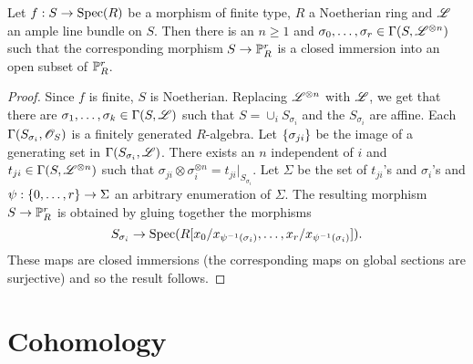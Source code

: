 \documentclass{memoir}
\begin{document}
\begin{thm}
    Let $f:S\to \Spec(R)$ be a morphism of finite type, $R$ a Noetherian ring and $\shf L$ an ample line bundle on $S$.
    Then there is an $n\ge 1$ and $\sigma_0,\dots,\sigma_r\in \Gamma(S,\shf L^{\otimes n})$ such that the corresponding morphism $S\to \P^r_R$ is a closed immersion into an open subset of $\P^r_R$.
\end{thm}
\begin{proof}
    Since $f$ is finite, $S$ is Noetherian.
    Replacing $\shf L^{\otimes n}$ with $\shf L$, we get that there are $\sigma_1,\dots,\sigma_k\in \Gamma(S,\shf L)$ such that $S = \cup_iS_{\sigma_i}$ and the $S_{\sigma_i}$ are affine.
    Each $\Gamma(S_{\sigma_i},\shf O_S)$ is a finitely generated $R$-algebra.
    Let $\set{\sigma_{ji}}$ be the image of a generating set in $\Gamma(S_{\sigma_i},\shf L)$.
    There exists an $n$ independent of $i$ and $t_{ji}\in \Gamma(S,\shf L^{\otimes n})$ such that $\sigma_{ji}\otimes \sigma_i^{\otimes n} = t_{ji}|_{S_{\sigma_i}}$.
    Let $\Sigma$ be the set of $t_{ji}$'s and $\sigma_i$'s and $\psi:\set{0,\dots,r}\to \Sigma$ an arbitrary enumeration of $\Sigma$.
    The resulting morphism $S\to \P^r_R$ is obtained by gluing together the morphisms
    \begin{equation}
        S_{\sigma_i} \to \Spec(R[x_0/x_{\psi^{-1}(\sigma_i)},\dots,x_r/x_{\psi^{-1}(\sigma_i)}]).
    \end{equation}
    These maps are closed immersions (the corresponding maps on global sections are surjective) and so the result follows.
\end{proof}
\section{Cohomology}
\end{document}
